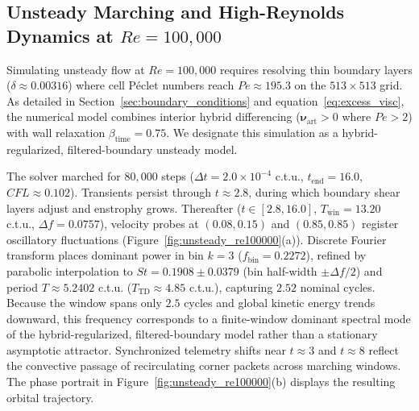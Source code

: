 \documentclass[11pt,a4paper]{article}
\begin{document}
\subsection{Unsteady Marching and High-Reynolds Dynamics at \texorpdfstring{$Re = 100,000$}{Re = 100000}}
Simulating unsteady flow at $Re = 100{,}000$ requires resolving thin boundary layers ($\delta \approx 0.00316$) where cell P\'eclet numbers reach $Pe \approx 195.3$ on the $513 \times 513$ grid. As detailed in Section~\ref{sec:boundary_conditions} and equation~\eqref{eq:excess_visc}, the numerical model combines interior hybrid differencing ($\boldsymbol{\nu}_{\text{art}} > 0$ where $Pe > 2$) with wall relaxation $\beta_{\text{time}} = 0.75$. We designate this simulation as a hybrid-regularized, filtered-boundary unsteady model.

The solver marched for $80{,}000$ steps ($\Delta t = 2.0 \times 10^{-4}$ c.t.u., $t_{\text{end}} = 16.0$, $CFL \approx 0.102$). Transients persist through $t \approx 2.8$, during which boundary shear layers adjust and enstrophy grows. Thereafter ($t \in [2.8, 16.0]$, $T_{\text{win}} = 13.20$ c.t.u., $\Delta f = 0.0757$), velocity probes at $(0.08, 0.15)$ and $(0.85, 0.85)$ register oscillatory fluctuations (Figure~\ref{fig:unsteady_re100000}(a)). Discrete Fourier transform places dominant power in bin $k = 3$ ($f_{\text{bin}} = 0.2272$), refined by parabolic interpolation to $St = 0.1908 \pm 0.0379$ (bin half-width $\pm \Delta f / 2$) and period $T \approx 5.2402$ c.t.u. ($T_{\text{TD}} \approx 4.85$ c.t.u.), capturing $2.52$ nominal cycles. Because the window spans only $2.5$ cycles and global kinetic energy trends downward, this frequency corresponds to a finite-window dominant spectral mode of the hybrid-regularized, filtered-boundary model rather than a stationary asymptotic attractor. Synchronized telemetry shifts near $t \approx 3$ and $t \approx 8$ reflect the convective passage of recirculating corner packets across marching windows. The phase portrait in Figure~\ref{fig:unsteady_re100000}(b) displays the resulting orbital trajectory.
\end{document}

